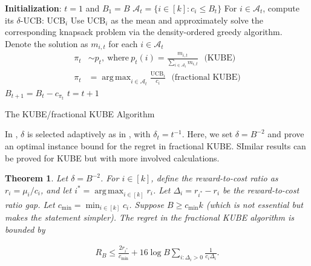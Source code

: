 \documentclass[letterpaper,11pt,openright,openany]{book}
\numberwithin{equation}{section}
\theoremstyle{plain}
\newtheorem{Th}{Theorem}[section]
\theoremstyle{definition}
\DeclareMathOperator*{\argmax}{arg\,max}
\begin{document}
\begin{algorithm}[H]
 \begin{algorithmic}[1]
 \STATE \textbf{Initialization}: $t=1$ and $B_1=B$
 \STATE $\mathcal A_t = \{i\in [k]: c_i\leq B_t\}$
\STATE For $i\in\mathcal A_t$, compute its $\delta$-UCB: $\text{UCB}_i$ 
\STATE Use $\text{UCB}_i$ as the mean and approximately solve the corresponding knapsack problem via the density-ordered greedy algorithm. Denote the solution as $m_{i,t}$ for each $i\in\mathcal A_t$\ \ \ 
\STATE \begin{align*}
\pi_t &\sim p_t,\ \text{where}\ p_t(i)=\frac{m_{i,t}}{\sum_{i\in\mathcal A_t}m_{i,t}}  \ \ \ \text{(KUBE)} \\
\pi_t &= \argmax_{i\in\mathcal A_t}\frac{\text{UCB}_i}{c_i} \ \ \ \text{(fractional KUBE)}
\end{align*}
\STATE $B_{t+1} = B_t-c_{\pi_t}$
\STATE $t = t+1$
\ENDWHILE
\end{algorithmic}
\caption{The KUBE/fractional KUBE Algorithm} 
\label{alg:KUBE}
\end{algorithm}

In \cite{tran2012knapsack}, $\delta$ is selected adaptively as in \cite{auer2002finite}, with $\delta_t = t^{-1}$. Here, we set $\delta = B^{-2}$ and prove an optimal instance bound for the regret in fractional KUBE. SImilar results can be proved for KUBE but with more involved calculations. 

\begin{Th}\label{thm:KUBE}
Let $\delta=B^{-2}$. For $i\in [k]$, define the reward-to-cost ratio as $r_i=\mu_i/c_i$, and let $i^* = \argmax_{i\in [k]}r_i$. Let $\Delta_i = r_{i^*}-r_i$ be the reward-to-cost ratio gap. 
Let $c_{\min} = \min_{i\in [k]}c_i$. %
Suppose $B\geq c_{\min}k$ (which is not essential but makes the statement simpler). The regret in the fractional KUBE algorithm is bounded by
\end{Th}
\begin{align*}
R_B\leq\frac{2r_{i^*}}{c_{\min}}+16\log B\sum_{i: \Delta_i>0}\frac{1}{c_i\Delta_i}.
\end{align*}
\end{document}
